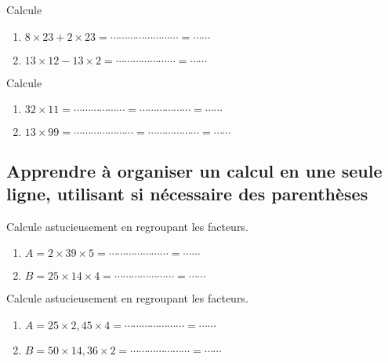 
Calcule
\begin{enumerate}
\item $8 \times 23 + 2 \times 23 =  \cdots \cdots  \cdots\cdots \cdots\cdots \cdots\cdots = \cdots \cdots$
\item $13 \times 12 - 13 \times 2 = \cdots \cdots\cdots \cdots\cdots \cdots\cdots  = \cdots \cdots$ 
\end{enumerate}



Calcule
\begin{enumerate}
\item $32 \times 11 = \cdots \cdots   \cdots\cdots  \cdots\cdots = \cdots\cdots \cdots\cdots \cdots\cdots= \cdots \cdots$
\item $13 \times 99 = \cdots \cdots\cdots \cdots\cdots \cdots\cdots  = \cdots\cdots \cdots\cdots \cdots\cdots= \cdots \cdots$
\end{enumerate}






\subsection{Apprendre à organiser un calcul en une seule ligne, utilisant si nécessaire des parenthèses}


Calcule astucieusement en regroupant les facteurs.

\begin{enumerate}
\item $A = 2 \times 39 \times 5 = \cdots \cdots\cdots \cdots\cdots \cdots\cdots  = \cdots \cdots$
\item $B = 25 \times 14 \times 4 = \cdots \cdots\cdots \cdots\cdots \cdots\cdots  = \cdots \cdots$
\end{enumerate}



Calcule astucieusement en regroupant les facteurs.

\begin{enumerate}
\item $A = 25 \times 2,45 \times 4 = \cdots \cdots\cdots \cdots\cdots \cdots\cdots  = \cdots \cdots$
\item $B = 50 \times 14,36 \times 2 = \cdots \cdots\cdots \cdots\cdots \cdots\cdots  = \cdots \cdots$
\end{enumerate}








